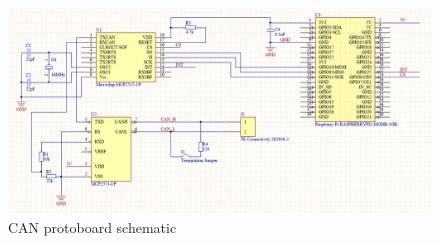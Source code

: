 \begin{figure}[!hb]
	\centering
	\includegraphics[width=0.9\linewidth]{figures/protoschematic}
	\caption{CAN protoboard schematic}
	\label{fig:schematic_proto_can}
\end{figure}

